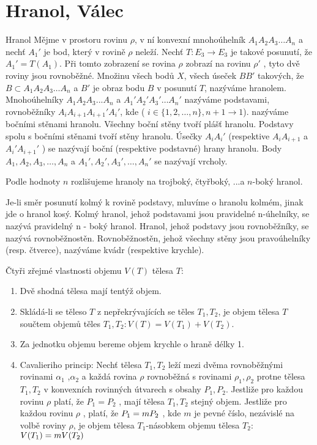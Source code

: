 
\let\braceru=\relax \let\bracelu=\relax 
\def\o#1{\setbox0=
	\hbox{$\kern2pt\overbrace{\kern-2pt#1\kern-2pt}\kern2pt$}\ht0=2.1ex\box0}
\def\to#1{\hbox{#1\rlap{\t{}}}}
\def\rad{\rm{rad}}
\def\f{\frac}
\section{Hranol, Válec}
\Def
Hranol
Mějme v prostoru rovinu $\rho$, v ní konvexní
mnohoúhelník $A_1 A_2 A_3 \dots A_n$ a nechť $A_1'$ je bod,
který v rovině $\rho$ neleží. Nechť $T : E_3 \rightarrow E_3$ je
takové posunutí, že $A_1' =T(A_1 )$. Při tomto
zobrazení se rovina $\rho$ zobrazí na rovinu $\rho'$ ,
tyto dvě roviny jsou rovnoběžné. Množinu
všech bodů $X$, všech úseček $BB'$ takových, že
$B \subset A_1 A_2 A_3 \dots A_n$ a $B'$ je obraz bodu $B$ v posunutí
$T$, nazýváme hranolem.
Mnohoúhelníky $A_1 A_2 A_3 ... A_n$ a $A_1' A_2' A_3' \dots A_n'$
nazýváme podstavami, rovnoběžníky $A_i A_{i+1}  A_{i+1}' A_i'$, kde ( $i \in \{ 1 , 2 ,\dots, n \}, n+1 \rightarrow 1 $).
nazýváme bočními stěnami hranolu. Všechny boční stěny tvoří plášť hranolu. Podstavy
spolu s bočními stěnami tvoří stěny hranolu. Úsečky $A_i A_i'$ (respektive $A_i A_{i+1}$ a $A_i'A_{i+1}'$ ) se nazývají
boční (respektive podstavné) hrany hranolu. Body $A_1 , A_2 , A_3 ,\dots, A_n$ a $A_1' , A_2' , A_3' ,\dots, A_n'$
se nazývají vrcholy.

\Poz
Podle hodnoty $n$ rozlišujeme hranoly na trojboký, čtyřboký, ...a $n$-boký hranol.

\Def
Je-li směr posunutí kolmý k rovině podstavy, mluvíme o hranolu kolmém, jinak jde o
hranol kosý. Kolmý hranol, jehož podstavami jsou pravidelné n-úhelníky, se nazývá
pravidelný
n - boký hranol. Hranol, jehož podstavy jsou rovnoběžníky, se nazývá rovnoběžnostěn.
Rovnoběžnostěn, jehož všechny stěny jsou pravoúhelníky (resp. čtverce), nazýváme kvádr
(respektive krychle).

\Poz
Čtyři zřejmé vlastnosti objemu $V(T)$ tělesa $T$:
\begin{enumerate}
	\item Dvě shodná tělesa mají tentýž objem.
	\item Skládá-li se těleso $T$ z nepřekrývajících se těles $T_1 ,T_2$, je objem tělesa $T$ součtem objemů
těles $T_1 ,T_2 : V(T)=V(T_1 )+V(T_2 )$.
\item Za jednotku objemu bereme objem krychle o hraně délky 1.
\item Cavalieriho princip:
Nechť tělesa $T_1 ,T_2$ leží mezi dvěma rovnoběžnými rovinami $\alpha_1$ ,$\alpha_2$ a každá rovina $\rho$
rovnoběžná s rovinami $\rho_1 , \rho_2$ protne tělesa $T_1 ,T_2$ v konvexních rovinných útvarech
s obsahy $P_1 , P_2$. Jestliže pro každou rovinu $\rho$ platí, že $P_1 = P_2$ , mají tělesa $T_1 ,T_2$ stejný
objem.
Jestliže pro každou rovinu $\rho$ , platí, že $P_1 = m\*P_2$ , kde $m$ je pevné číslo, nezávislé na
volbě roviny $\rho$, je objem tělesa $T_1$-násobkem objemu tělesa $T_2$: $V ( T_1 ) = m \* V ( T_2 )$
\end{enumerate}
	

\EndDoc


